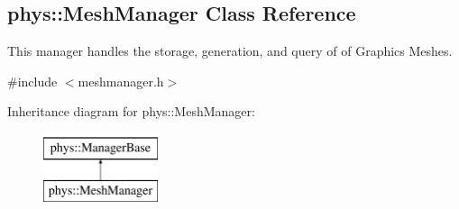\hypertarget{classphys_1_1MeshManager}{
\subsection{phys::MeshManager Class Reference}
\label{classphys_1_1MeshManager}
}


This manager handles the storage, generation, and query of of Graphics Meshes.  




{\ttfamily \#include $<$meshmanager.h$>$}

Inheritance diagram for phys::MeshManager:\begin{figure}[H]
\begin{center}
\leavevmode
\includegraphics[height=2.000000cm]{classphys_1_1MeshManager}
\end{center}
\end{figure}
